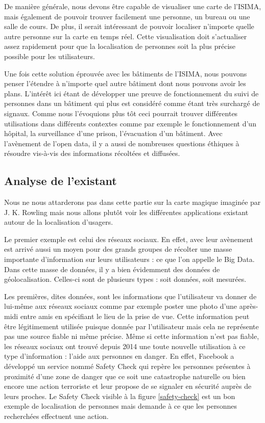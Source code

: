 De manière générale, nous devons être capable de visualiser une carte de l'ISIMA, mais également de pouvoir trouver facilement une personne, un bureau ou une salle de cours. De plus, il serait intéressant de pouvoir localiser n'importe quelle autre personne sur la carte en temps réel. Cette visualisation doit s'actualiser assez rapidement pour que la localisation de personnes soit la plus précise possible pour les utilisateurs.

Une fois cette solution éprouvée avec les bâtiments de l'ISIMA, nous pouvons penser l'étendre à n'importe quel autre bâtiment dont nous pouvons avoir les plans. L’intérêt ici étant de développer une preuve de fonctionnement du suivi de personnes dans un bâtiment qui plus est considéré comme étant très surchargé de signaux. Comme nous l’évoquions plus tôt ceci pourrait trouver différentes utilisations dans différents contextes comme par exemple le fonctionnement d’un hôpital, la surveillance d’une prison, l’évacuation d’un bâtiment. Avec l’avènement de l’open data, il y a aussi de nombreuses questions éthiques à résoudre vis-à-vis des informations récoltées et diffusées.


\subsection{Analyse de l'existant}

Nous ne nous attarderons pas dans cette partie sur la carte magique imaginée par J. K. Rowling mais nous allons plutôt voir les différentes applications existant autour de la localisation d’usagers.

Le premier exemple est celui des réseaux sociaux. En effet, avec leur avènement est arrivé aussi un moyen pour des grands groupes de récolter une masse importante d’information sur leurs utilisateurs : ce que l’on appelle le Big Data. Dans cette masse de données, il y a bien évidemment des données de géolocalisation. Celles-ci sont de plusieurs types : soit données, soit mesurées.

Les premières, dites données, sont les informations que l’utilisateur va donner de lui-même aux réseaux sociaux comme par exemple poster une photo d’une après-midi entre amis en spécifiant le lieu de la prise de vue. Cette information peut être légitimement utilisée puisque donnée par l’utilisateur mais cela ne représente pas une source fiable ni même précise. Même si cette information n’est pas fiable, les réseaux sociaux ont trouvé depuis 2014 une toute nouvelle utilisation à ce type d’information : l’aide aux personnes en danger. En effet, Facebook a développé un service nommé Safety Check qui repère les personnes présentes à proximité d’une zone de danger que ce soit une catastrophe naturelle ou bien encore une action terroriste et leur propose de se signaler en sécurité auprès de leurs proches. Le Safety Check visible à la figure \ref{safety-check} est un bon exemple de localisation de personnes mais demande à ce que les personnes recherchées effectuent une action.

